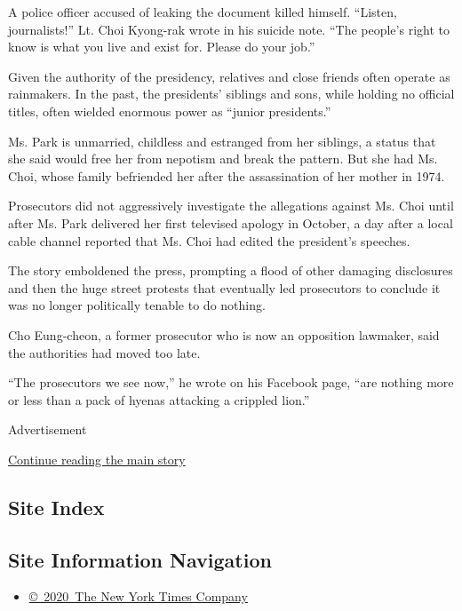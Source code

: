 A police officer accused of leaking the document killed himself.
``Listen, journalists!'' Lt. Choi Kyong-rak wrote in his suicide note.
``The people's right to know is what you live and exist for. Please do
your job.''

Given the authority of the presidency, relatives and close friends often
operate as rainmakers. In the past, the presidents' siblings and sons,
while holding no official titles, often wielded enormous power as
``junior presidents.''

Ms. Park is unmarried, childless and estranged from her siblings, a
status that she said would free her from nepotism and break the pattern.
But she had Ms. Choi, whose family befriended her after the
assassination of her mother in 1974.

Prosecutors did not aggressively investigate the allegations against Ms.
Choi until after Ms. Park delivered her first televised apology in
October, a day after a local cable channel reported that Ms. Choi had
edited the president's speeches.

The story emboldened the press, prompting a flood of other damaging
disclosures and then the huge street protests that eventually led
prosecutors to conclude it was no longer politically tenable to do
nothing.

Cho Eung-cheon, a former prosecutor who is now an opposition lawmaker,
said the authorities had moved too late.

``The prosecutors we see now,'' he wrote on his Facebook page, ``are
nothing more or less than a pack of hyenas attacking a crippled lion.''

Advertisement

\protect\hyperlink{after-bottom}{Continue reading the main story}

\hypertarget{site-index}{%
\subsection{Site Index}\label{site-index}}

\hypertarget{site-information-navigation}{%
\subsection{Site Information
Navigation}\label{site-information-navigation}}

\begin{itemize}
\tightlist
\item
  \href{https://help.nytimes.com/hc/en-us/articles/115014792127-Copyright-notice}{©~2020~The
  New York Times Company}
\end{itemize}


